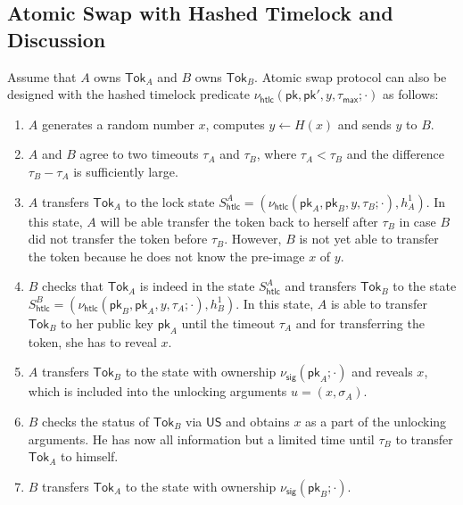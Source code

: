 \documentclass{article}
\newcommand{\pubkey}[0]{\mathsf{pk}}
\newcommand{\unisrv}[0]{\mathsf{US}}
\begin{document}
\subsection{Atomic Swap with Hashed Timelock and Discussion}
Assume that $A$ owns $\mathsf{Tok}_A$
and $B$ owns $\mathsf{Tok}_B$.
Atomic swap protocol can also be designed with the hashed timelock predicate \cite{Herl18,Bitc18a,Bitc18b}  $\nu_\mathsf{htlc}(\pubkey,\pubkey',y,\tau_\mathsf{max};\cdot)$ as follows:
\begin{enumerate}
\item $A$ generates a random number $x$, computes $y\gets H(x)$ and sends $y$ to $B$.
\item $A$ and $B$ agree to two timeouts $\tau_A$ and $\tau_B$, where $\tau_A < \tau_B$ and the difference $\tau_B-\tau_A$ is sufficiently large.

\item $A$ transfers $\mathsf{Tok}_A$ to the lock state $S^A_\mathsf{htlc}=(\nu_\mathsf{htlc}(\pubkey_A,\pubkey_B,y,\tau_B;\cdot), h^1_A)$. In this state, $A$ will be able transfer the token back to herself after $\tau_B$
in case $B$ did not transfer the token before $\tau_B$. However, $B$ is not yet able to transfer the token because he does not know the pre-image $x$ of $y$.

\item $B$ checks that $\mathsf{Tok}_A$ is indeed in the state $S^A_\mathsf{htlc}$ and
transfers $\mathsf{Tok}_B$ to the state $S^B_\mathsf{htlc}=(\nu_\mathsf{htlc}(\pubkey_B,\pubkey_A,y,\tau_A;\cdot), h^1_B)$. In this state, $A$ is able to transfer $\mathsf{Tok}_B$ to her public key $\pubkey_A$ until the timeout $\tau_A$ and for transferring the token, she has to reveal $x$.

\item $A$ transfers $\mathsf{Tok}_B$ to the state with ownership $\nu_\mathsf{sig}(\pubkey_A;\cdot)$ and reveals $x$, which is included into the unlocking arguments $u=(x,\sigma_A)$.

\item $B$ checks the status of $\mathsf{Tok}_B$ via $\unisrv$ and obtains $x$ as a part of the unlocking arguments. He has now all information but a limited time until $\tau_B$ to transfer $\mathsf{Tok}_A$ to himself.

\item $B$ transfers $\mathsf{Tok}_A$ to the state with ownership $\nu_\mathsf{sig}(\pubkey_B;\cdot)$.
\end{enumerate}
\end{document}
